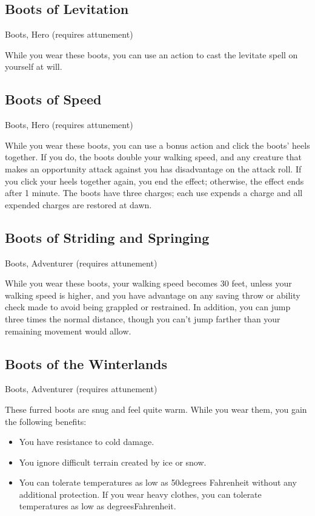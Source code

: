 \subsection{Boots of Levitation}
Boots, Hero (requires attunement) 

While you wear these boots, you can use an action to cast the levitate spell on yourself at will.

\subsection{Boots of Speed}
Boots, Hero (requires attunement) 

While you wear these boots, you can use a bonus action and click the boots' heels together. If you do, the boots double your walking speed, and any creature that makes an opportunity attack against you has disadvantage on the attack roll. If you click your heels together again, you end the effect; otherwise, the effect ends after 1 minute. The boots have three charges; each use expends a charge and all expended charges are restored at dawn.

\subsection{Boots of Striding and Springing}
Boots, Adventurer (requires attunement) 

While you wear these boots, your walking speed becomes 30 feet, unless your walking speed is higher, and you have advantage on any saving throw or ability check made to avoid being grappled or restrained. In addition, you can jump three times the normal distance, though you can't jump farther than your remaining movement would allow.

\subsection{Boots of the Winterlands}
Boots, Adventurer (requires attunement)

These furred boots are snug and feel quite warm. While you wear them, you gain the following benefits:
\begin{itemize}
 \item You have resistance to cold damage.
 \item You ignore difficult terrain created by ice or snow.
 \item You can tolerate temperatures as low as \textminus50degrees Fahrenheit without any additional protection. If you wear heavy clothes, you can tolerate temperatures as low as  degreesFahrenheit.
\end{itemize}

